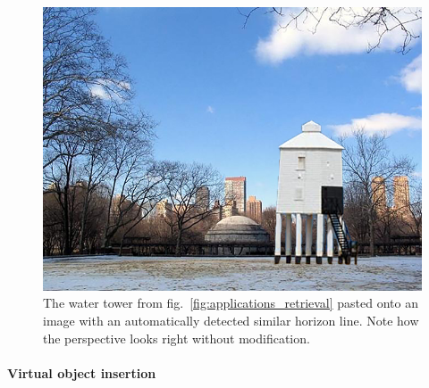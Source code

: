 \begin{figure}[!t]
\centering
\includegraphics[width=0.7\linewidth]{figures/applications/2d_compositing.jpg}
\caption{The water tower from fig.~\ref{fig:applications_retrieval} pasted onto an image with an automatically detected similar horizon line. Note how the perspective looks right without modification.\vspace{-0.7em}}
\label{fig:applications_2d_compositing}
\vspace{-0.5em}
\end{figure}

\paragraph{Virtual object insertion}

